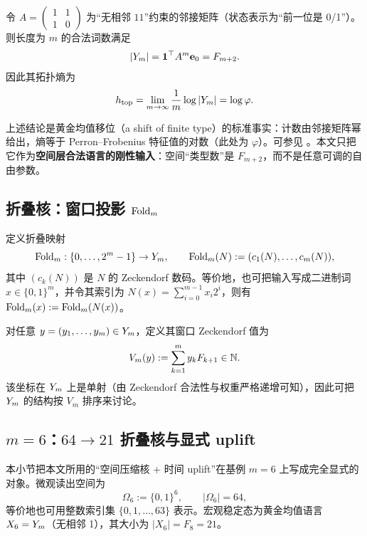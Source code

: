 \begin{proposition}[黄金均值语言的计数与刚性]\label{prop:golden_mean_language_count_entropy}
令 \(A=\begin{pmatrix}1&1\\ 1&0\end{pmatrix}\) 为“无相邻 \(11\)”约束的邻接矩阵（状态表示为“前一位是 0/1”）。则长度为 \(m\) 的合法词数满足
$$
|Y_m|=\mathbf{1}^\top A^{m}\mathbf{e}_0 = F_{m+2}.
$$
因此其拓扑熵为
$$
h_{\mathrm{top}}=\lim_{m\to\infty}\frac{1}{m}\log |Y_m|=\log\varphi.
$$
\end{proposition}

\begin{remark}[引用与使用范围]
上述结论是黄金均值移位（a shift of finite type）的标准事实：计数由邻接矩阵幂给出，熵等于 Perron--Frobenius 特征值的对数（此处为 \(\varphi\)）。可参见 \cite{LindMarcus1995,Koshy2001}。本文只把它作为\textbf{空间层合法语言的刚性输入}：空间“类型数”是 \(F_{m+2}\)，而不是任意可调的自由参数。
\end{remark}

\subsection{折叠核：窗口投影 \texorpdfstring{$\mathrm{Fold}_m$}{Fold}}
\begin{definition}\label{def:fold}
定义折叠映射
$$
\mathrm{Fold}_m:\{0,\dots,2^m-1\}\to Y_m,\qquad \mathrm{Fold}_m(N):=(c_1(N),\dots,c_m(N)),
$$
其中 \((c_k(N))\) 是 \(N\) 的 Zeckendorf 数码。等价地，也可把输入写成二进制词 \(x\in\{0,1\}^m\)，并令其索引为 \(N(x)=\sum_{i=0}^{m-1} x_i2^i\)，则有 \(\mathrm{Fold}_m(x):=\mathrm{Fold}_m(N(x))\)。
\end{definition}

\begin{definition}\label{def:Vm_general}
对任意 \(y=(y_1,\dots,y_m)\in Y_m\)，定义其窗口 Zeckendorf 值为
$$
V_m(y):=\sum_{k=1}^{m} y_k F_{k+1}\in\mathbb{N}.
$$
该坐标在 \(Y_m\) 上是单射（由 Zeckendorf 合法性与权重严格递增可知），因此可把 \(Y_m\) 的结构按 \(V_m\) 排序来讨论。
\end{definition}

\subsection{\texorpdfstring{$m=6$}{m=6}：\texorpdfstring{$64\to 21$}{64->21} 折叠核与显式 uplift}
\label{subsec:m6_kernel_uplift}

本小节把本文所用的“空间压缩核 + 时间 uplift”在基例 \(m=6\) 上写成完全显式的对象。微观读出空间为
$$
\Omega_6:=\{0,1\}^6,\qquad |\Omega_6|=64,
$$
等价地也可用整数索引集 \(\{0,1,\dots,63\}\) 表示。宏观稳定态为黄金均值语言 \(X_6=Y_m\)（无相邻 1），其大小为 \(|X_6|=F_8=21\)。

